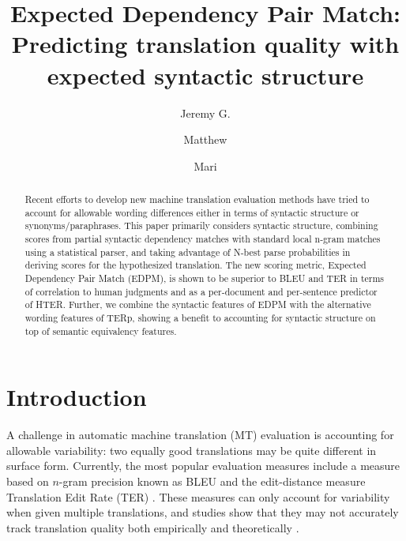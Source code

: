 \documentclass{kluwer}    %
\begin{document}
\begin{article}
\begin{opening}         
\title{Expected Dependency Pair Match:
Predicting translation quality with expected syntactic structure} 
\author{Jeremy G. }  
\author{Matthew }
\author{Mari }  

\begin{abstract}
  Recent efforts to develop new machine translation
  evaluation methods have tried to 
  account for allowable wording differences either in terms of
  syntactic structure or synonyms/paraphrases. This paper primarily considers syntactic structure, combining scores from partial syntactic dependency
  matches with standard local n-gram matches using a statistical
  parser, and taking advantage of N-best parse probabilities in deriving
  scores for the hypothesized
  translation.  The new scoring metric, Expected Dependency
  Pair Match (EDPM), is shown to be superior to BLEU and TER in terms
  of correlation to human judgments and as a per-document and
  per-sentence predictor of HTER. Further, we combine the syntactic features of EDPM with the
  alternative wording features of TERp, showing a benefit to accounting for syntactic structure on top of
  semantic equivalency features.
\end{abstract}

\end{opening}           

\section{Introduction}
\label{sec:intro}

A challenge in automatic machine translation (MT) evaluation is accounting
for allowable variability: two equally good
translations may be quite different in surface form. 
Currently, the most popular evaluation measures include a measure
based on $n$-gram precision known as BLEU \cite{papineni02bleu} and
the edit-distance measure Translation Edit Rate (TER)
\cite{snover06ter}.  These measures can only account for variability when 
given multiple translations, and studies show that they may
not accurately track translation quality both empirically
\cite{charniak03syntaxlmmt} and theoretically
\cite{callisonburch06bleuproblems}.


\end{article}
\end{document}
